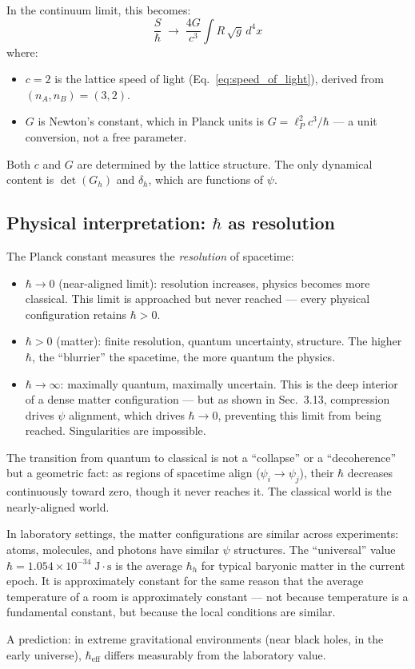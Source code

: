 In the continuum limit, this becomes:
\begin{equation}
\frac{S}{\hbar} \;\to\; \frac{4G}{c^3}\int R\,\sqrt{g}\,d^4x
\end{equation}
where:
\begin{itemize}
\item $c = 2$ is the lattice speed of light (Eq.~\ref{eq:speed_of_light}), derived from $(n_A, n_B) = (3, 2)$.
\item $G$ is Newton's constant, which in Planck units is $G = \ell_P^2 c^3/\hbar$ --- a unit conversion, not a free parameter.
\end{itemize}

Both $c$ and $G$ are determined by the lattice structure. The only dynamical content is $\det(G_h)$ and $\delta_h$, which are functions of $\psi$.

\subsection{Physical interpretation: $\hbar$ as resolution}

The Planck constant measures the \emph{resolution} of spacetime:
\begin{itemize}
\item $\hbar \to 0$ (near-aligned limit): resolution increases, physics becomes more classical. This limit is approached but never reached --- every physical configuration retains $\hbar > 0$.
\item $\hbar > 0$ (matter): finite resolution, quantum uncertainty, structure. The higher $\hbar$, the ``blurrier'' the spacetime, the more quantum the physics.
\item $\hbar \to \infty$: maximally quantum, maximally uncertain. This is the deep interior of a dense matter configuration --- but as shown in Sec.~3.13, compression drives $\psi$ alignment, which drives $\hbar \to 0$, preventing this limit from being reached. Singularities are impossible.
\end{itemize}

The transition from quantum to classical is not a ``collapse'' or a ``decoherence'' but a geometric fact: as regions of spacetime align ($\psi_i \to \psi_j$), their $\hbar$ decreases continuously toward zero, though it never reaches it. The classical world is the nearly-aligned world.

\begin{remark}
In laboratory settings, the matter configurations are similar across experiments: atoms, molecules, and photons have similar $\psi$ structures. The ``universal'' value $\hbar = 1.054 \times 10^{-34}\;\text{J}\cdot\text{s}$ is the average $\hbar_h$ for typical baryonic matter in the current epoch. It is approximately constant for the same reason that the average temperature of a room is approximately constant --- not because temperature is a fundamental constant, but because the local conditions are similar.

A prediction: in extreme gravitational environments (near black holes, in the early universe), $\hbar_\text{eff}$ differs measurably from the laboratory value.
\end{remark}
